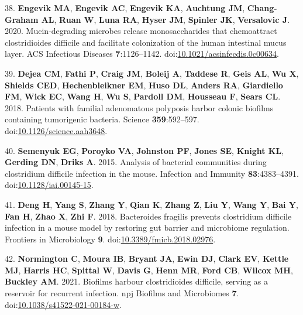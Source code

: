 \documentclass[
  11pt,
]{article}
\begin{document}
\leavevmode\hypertarget{ref-Engevik2020}{}%
38. \textbf{Engevik MA}, \textbf{Engevik AC}, \textbf{Engevik KA},
\textbf{Auchtung JM}, \textbf{Chang-Graham AL}, \textbf{Ruan W},
\textbf{Luna RA}, \textbf{Hyser JM}, \textbf{Spinler JK},
\textbf{Versalovic J}. 2020. Mucin-degrading microbes release
monosaccharides that chemoattract clostridioides difficile and
facilitate colonization of the human intestinal mucus layer. ACS
Infectious Diseases \textbf{7}:1126--1142.
doi:\href{https://doi.org/10.1021/acsinfecdis.0c00634}{10.1021/acsinfecdis.0c00634}.

\leavevmode\hypertarget{ref-Dejea2018}{}%
39. \textbf{Dejea CM}, \textbf{Fathi P}, \textbf{Craig JM},
\textbf{Boleij A}, \textbf{Taddese R}, \textbf{Geis AL}, \textbf{Wu X},
\textbf{Shields CED}, \textbf{Hechenbleikner EM}, \textbf{Huso DL},
\textbf{Anders RA}, \textbf{Giardiello FM}, \textbf{Wick EC},
\textbf{Wang H}, \textbf{Wu S}, \textbf{Pardoll DM}, \textbf{Housseau
F}, \textbf{Sears CL}. 2018. Patients with familial adenomatous
polyposis harbor colonic biofilms containing tumorigenic bacteria.
Science \textbf{359}:592--597.
doi:\href{https://doi.org/10.1126/science.aah3648}{10.1126/science.aah3648}.

\leavevmode\hypertarget{ref-Semenyuk2015}{}%
40. \textbf{Semenyuk EG}, \textbf{Poroyko VA}, \textbf{Johnston PF},
\textbf{Jones SE}, \textbf{Knight KL}, \textbf{Gerding DN},
\textbf{Driks A}. 2015. Analysis of bacterial communities during
clostridium difficile infection in the mouse. Infection and Immunity
\textbf{83}:4383--4391.
doi:\href{https://doi.org/10.1128/iai.00145-15}{10.1128/iai.00145-15}.

\leavevmode\hypertarget{ref-Deng2018}{}%
41. \textbf{Deng H}, \textbf{Yang S}, \textbf{Zhang Y}, \textbf{Qian K},
\textbf{Zhang Z}, \textbf{Liu Y}, \textbf{Wang Y}, \textbf{Bai Y},
\textbf{Fan H}, \textbf{Zhao X}, \textbf{Zhi F}. 2018. Bacteroides
fragilis prevents clostridium difficile infection in a mouse model by
restoring gut barrier and microbiome regulation. Frontiers in
Microbiology \textbf{9}.
doi:\href{https://doi.org/10.3389/fmicb.2018.02976}{10.3389/fmicb.2018.02976}.

\leavevmode\hypertarget{ref-Normington2021}{}%
42. \textbf{Normington C}, \textbf{Moura IB}, \textbf{Bryant JA},
\textbf{Ewin DJ}, \textbf{Clark EV}, \textbf{Kettle MJ}, \textbf{Harris
HC}, \textbf{Spittal W}, \textbf{Davis G}, \textbf{Henn MR},
\textbf{Ford CB}, \textbf{Wilcox MH}, \textbf{Buckley AM}. 2021.
Biofilms harbour clostridioides difficile, serving as a reservoir for
recurrent infection. npj Biofilms and Microbiomes \textbf{7}.
doi:\href{https://doi.org/10.1038/s41522-021-00184-w}{10.1038/s41522-021-00184-w}.
\end{document}
